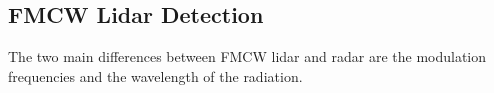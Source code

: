 \subsection{FMCW Lidar Detection}
The two main differences between FMCW lidar and radar are the modulation frequencies and the wavelength of the 
radiation. 





